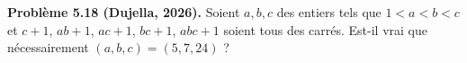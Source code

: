 \textbf{Problème 5.18 (Dujella, 2026).} Soient $a,b,c$ des entiers tels que $1<a<b<c$ et $c+1$, $ab+1$, $ac+1$, $bc+1$, $abc+1$ soient tous des carrés. Est-il vrai que nécessairement $(a,b,c)=(5,7,24)$ ?
